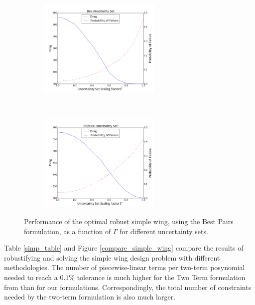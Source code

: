 \begin{figure}[h]
    \centering
    \captionsetup{justification=centering, font=small}
    \begin{subfigure}{0.49\textwidth}
        \centering
        \includegraphics[height=1.85in]{simple_wing_results/box.png}
    \end{subfigure}%
    ~ 
    \begin{subfigure}{0.49\textwidth}
        \centering
        \includegraphics[height=1.85in]{simple_wing_results/ell.png}
    \end{subfigure}
    \caption{Performance of the optimal robust simple wing, using the Best Pairs formulation, as a function of $\Gamma$ for different uncertainty sets.}
    \label{simple_wing_var_gamma}
\end{figure}

Table \ref{simp_table} and Figure \ref{compare_simple_wing} compare the results of robustifying and solving the simple wing design problem with different methodologies. The number of piecewise-linear terms per two-term posynomial needed to reach a $0.1\%$ tolerance is much higher for the Two Term formulation from \cite{hsiung_kim_boyd_2007} than for our formulations. Correspondingly, the total number of constraints needed by the two-term formulation is also much larger.

